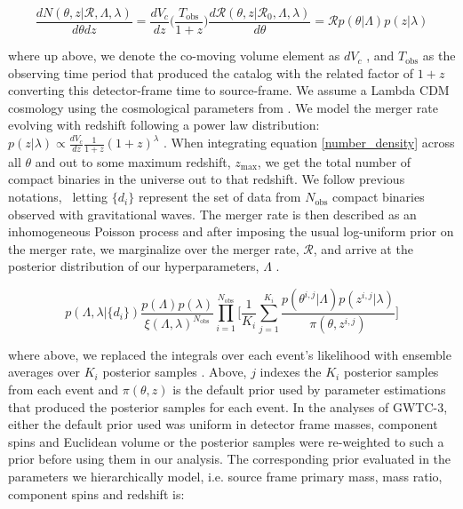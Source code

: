 \begin{equation} \label{number_density}
     \frac{dN(\theta, z | \mathcal{R}, \Lambda, \lambda)}{d\theta dz} = \frac{dV_c}{dz}\bigg(\frac{T_\mathrm{obs}}{1+z}\bigg) \frac{d\mathcal{R}(\theta, z | \mathcal{R}_0, \Lambda, \lambda)}{d\theta} = \mathcal{R} p(\theta | \Lambda) p(z | \lambda)
\end{equation}

\noindent
where up above, we denote the co-moving volume element as $dV_c$ \citep{hogg_cosmo}, and $T_\mathrm{obs}$ as the observing time period that produced the 
catalog with the related factor of $1+z$ converting this detector-frame time to source-frame. We assume a Lambda CDM cosmology using 
the cosmological parameters from \citet{Planck2015}. We model the merger rate evolving with redshift following a power law distribution: 
$p(z|\lambda) \propto \frac{dV_c}{dz}\frac{1}{1+z}(1+z)^\lambda$ \citep{Fishbach_2018redshift}. When integrating equation \ref{number_density} across all $\theta$
and out to some maximum redshift, $z_\mathrm{max}$, we get the total number of compact binaries in the universe out to that redshift. We follow previous notations, \
letting $\{d_i\}$ represent the set of data from $N_\mathrm{obs}$ compact binaries observed with gravitational waves. The merger rate is then described as an inhomogeneous 
Poisson process and after imposing the usual log-uniform prior on the merger rate, we marginalize over the merger rate, $\mathcal{R}$, and arrive at the posterior
distribution of our hyperparameters, $\Lambda$ \citep{Mandel_2019, Vitale_2021}.

\begin{equation}
    p\left(\Lambda, \lambda | \{d_i\}\right) \frac{p(\Lambda)p(\lambda)}{\xi(\Lambda,\lambda)^{N_\mathrm{obs}}} \prod_{i=1}^{N_\mathrm{obs}} \bigg[ \frac{1}{K_i} \sum_{j=1}^{K_i} \frac{p(\theta^{i,j}|\Lambda)p(z^{i,j}|\lambda)}{\pi(\theta, z^{i,j})} \bigg]
\end{equation}

\noindent
where above, we replaced the integrals over each event's likelihood with ensemble averages over $K_i$ posterior samples \citep{GWTC3DATA}. Above, $j$
indexes the $K_i$ posterior samples from each event and $\pi(\theta, z)$ is the default prior used by parameter estimations that 
produced the posterior samples for each event. In the analyses of GWTC-3, either the default prior used was uniform in detector frame masses, 
component spins and Euclidean volume or the posterior samples were re-weighted to such a prior before using them in our analysis. 
The corresponding prior evaluated in the parameters we hierarchically model, i.e. source frame primary mass, mass ratio, component spins and redshift is:

